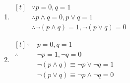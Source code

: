 \documentclass{report}
\begin{document}
\begin{enumerate}[label=\textbf{Sol. \arabic*}, leftmargin=*]
    \item $\begin{aligned}[t]
                   & \because p = 0, q = 1                                \\
                   & \therefore p \land q = 0, p \lor q = 1               \\
                   & \therefore \neg (p \land q) = 1, \neg (p \lor q) = 0
              \end{aligned}$

    \item $\begin{aligned}[t]
                  \because   & \ p = 0, q = 1                                   \\
                  \therefore & \ \neg p = 1, \neg q = 0                         \\
                             & \ \neg (p \land q) \equiv \neg p \lor \neg q = 1 \\
                             & \ \neg (p \lor q) \equiv \neg p \land \neg q = 0
              \end{aligned}$
\end{enumerate}
\end{document}
